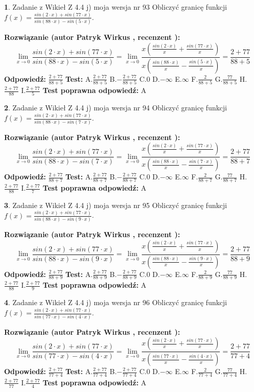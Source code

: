 \documentclass[12pt, a4paper]{article}
\theoremstyle{definition} %
\newtheorem{zad}{}
\newcommand{\zadStart}[1]{\begin{zad}#1\newline}
\newcommand{\zadStop}{\end{zad}}
\newcommand{\rozwStart}[2]{\noindent \textbf{Rozwiązanie (autor #1 , recenzent #2): }\newline}
\newcommand{\rozwStop}{\newline}
\newcommand{\odpStart}{\noindent \textbf{Odpowiedź:}\newline}
\newcommand{\odpStop}{\newline}
\newcommand{\testStart}{\noindent \textbf{Test:}\newline}
\newcommand{\testStop}{\newline}
\newcommand{\kluczStart}{\noindent \textbf{Test poprawna odpowiedź:}\newline}
\newcommand{\kluczStop}{\newline}
\begin{document}
\zadStart{Zadanie z Wikieł Z 4.4 j) moja wersja nr 93}
Obliczyć granicę funkcji $f(x)=\frac{sin(2\cdot x) +sin(77\cdot x)}{sin(88\cdot x) -sin(5\cdot x)}$.
\zadStop
\rozwStart{Patryk Wirkus}{}
$$\lim\limits_{x\to 0}\frac{sin(2\cdot x) +sin(77\cdot x)}{sin(88\cdot x) -sin(5\cdot x)}=\lim\limits_{x\to 0}\frac{x(\frac{sin(2\cdot x)}{x}+\frac{sin(77\cdot x)}{x})}{x(\frac{sin(88\cdot x)}{x}-\frac{sin(5\cdot x)}{x})}=\frac{2+77}{88+5}$$
\rozwStop
\odpStart
$\frac{2+77}{88+5}$
\odpStop
\testStart
A.$\frac{2+77}{88+5}$
B.$-\frac{2+77}{88+5}$
C.$0$
D.$-\infty$
E.$\infty$
F.$\frac{2}{88+5}$
G.$\frac{77}{88+5}$
H.$\frac{2+77}{88}$
I.$\frac{2+77}{5}$
\testStop
\kluczStart
A
\kluczStop



\zadStart{Zadanie z Wikieł Z 4.4 j) moja wersja nr 94}
Obliczyć granicę funkcji $f(x)=\frac{sin(2\cdot x) +sin(77\cdot x)}{sin(88\cdot x) -sin(7\cdot x)}$.
\zadStop
\rozwStart{Patryk Wirkus}{}
$$\lim\limits_{x\to 0}\frac{sin(2\cdot x) +sin(77\cdot x)}{sin(88\cdot x) -sin(7\cdot x)}=\lim\limits_{x\to 0}\frac{x(\frac{sin(2\cdot x)}{x}+\frac{sin(77\cdot x)}{x})}{x(\frac{sin(88\cdot x)}{x}-\frac{sin(7\cdot x)}{x})}=\frac{2+77}{88+7}$$
\rozwStop
\odpStart
$\frac{2+77}{88+7}$
\odpStop
\testStart
A.$\frac{2+77}{88+7}$
B.$-\frac{2+77}{88+7}$
C.$0$
D.$-\infty$
E.$\infty$
F.$\frac{2}{88+7}$
G.$\frac{77}{88+7}$
H.$\frac{2+77}{88}$
I.$\frac{2+77}{7}$
\testStop
\kluczStart
A
\kluczStop



\zadStart{Zadanie z Wikieł Z 4.4 j) moja wersja nr 95}
Obliczyć granicę funkcji $f(x)=\frac{sin(2\cdot x) +sin(77\cdot x)}{sin(88\cdot x) -sin(9\cdot x)}$.
\zadStop
\rozwStart{Patryk Wirkus}{}
$$\lim\limits_{x\to 0}\frac{sin(2\cdot x) +sin(77\cdot x)}{sin(88\cdot x) -sin(9\cdot x)}=\lim\limits_{x\to 0}\frac{x(\frac{sin(2\cdot x)}{x}+\frac{sin(77\cdot x)}{x})}{x(\frac{sin(88\cdot x)}{x}-\frac{sin(9\cdot x)}{x})}=\frac{2+77}{88+9}$$
\rozwStop
\odpStart
$\frac{2+77}{88+9}$
\odpStop
\testStart
A.$\frac{2+77}{88+9}$
B.$-\frac{2+77}{88+9}$
C.$0$
D.$-\infty$
E.$\infty$
F.$\frac{2}{88+9}$
G.$\frac{77}{88+9}$
H.$\frac{2+77}{88}$
I.$\frac{2+77}{9}$
\testStop
\kluczStart
A
\kluczStop



\zadStart{Zadanie z Wikieł Z 4.4 j) moja wersja nr 96}
Obliczyć granicę funkcji $f(x)=\frac{sin(2\cdot x) +sin(77\cdot x)}{sin(77\cdot x) -sin(4\cdot x)}$.
\zadStop
\rozwStart{Patryk Wirkus}{}
$$\lim\limits_{x\to 0}\frac{sin(2\cdot x) +sin(77\cdot x)}{sin(77\cdot x) -sin(4\cdot x)}=\lim\limits_{x\to 0}\frac{x(\frac{sin(2\cdot x)}{x}+\frac{sin(77\cdot x)}{x})}{x(\frac{sin(77\cdot x)}{x}-\frac{sin(4\cdot x)}{x})}=\frac{2+77}{77+4}$$
\rozwStop
\odpStart
$\frac{2+77}{77+4}$
\odpStop
\testStart
A.$\frac{2+77}{77+4}$
B.$-\frac{2+77}{77+4}$
C.$0$
D.$-\infty$
E.$\infty$
F.$\frac{2}{77+4}$
G.$\frac{77}{77+4}$
H.$\frac{2+77}{77}$
I.$\frac{2+77}{4}$
\testStop
\kluczStart
A
\kluczStop
\end{document}
